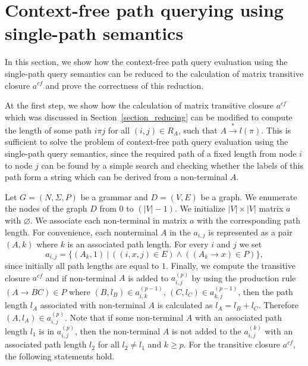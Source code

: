 \section{Context-free path querying using single-path semantics}
In this section, we show how the context-free path query evaluation using the single-path query semantics can be reduced to the calculation of matrix transitive closure $a^{cf}$ and prove the correctness of this reduction.

At the first step, we show how the calculation of matrix transitive closure $a^{cf}$ which was discussed in Section~\ref{section_reducing} can be modified to compute the length of some path $i \pi j$ for all $(i,j) \in R_A$, such that $A \xrightarrow{*} l(\pi)$. This is sufficient to solve the problem of context-free path query evaluation using the single-path query semantics, since the required path of a fixed length from node $i$ to node $j$ can be found by a simple search and checking whether the labels of this path form a string which can be derived from a non-terminal $A$.

Let $G = (N,\Sigma,P)$ be a grammar and $D = (V, E)$ be a graph. We enumerate the nodes of the graph $D$ from 0 to $(|V| - 1)$. We initialize $|V| \times |V|$ matrix $a$ with $\varnothing$. We associate each non-terminal in matrix $a$ with the corresponding path length. For convenience, each nonterminal $A$ in the $a_{i,j}$ is represented as a pair $(A,k)$ where $k$ is an associated path length. For every $i$ and $j$ we set $$a_{i,j} = \{(A_k,1)~|~((i,x,j) \in E) \wedge ((A_k \rightarrow x) \in P)\},$$ since initially all path lengths are equal to $1$. Finally, we compute the transitive closure $a^{cf}$ and if non-terminal $A$ is added to $a^{(p)}_{i,j}$ by using the production rule $(A \rightarrow B C) \in P$ where $(B,l_B) \in a^{(p-1)}_{i,k}$, $(C,l_C) \in a^{(p-1)}_{k,j}$, then the path length $l_A$ associated with non-terminal $A$ is calculated as $l_A = l_B + l_C$. Therefore $(A, l_A) \in a^{(p)}_{i,j}$. Note that if some non-terminal $A$ with an associated path length $l_1$ is in $a^{(p)}_{i,j}$, then the non-terminal $A$ is not added to the $a^{(k)}_{i,j}$ with an associated path length $l_2$ for all $l_2 \neq l_1$ and $k \geq p$. For the transitive closure $a^{cf}$, the following statements hold.

